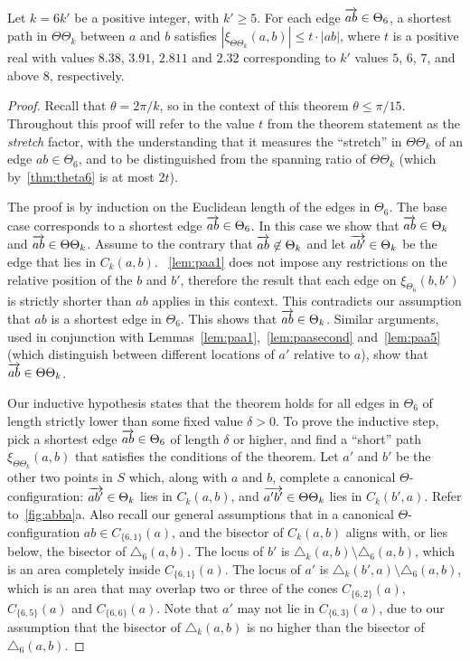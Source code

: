 \documentclass[runningheads,a4paper]{llncs}
\newcommand{\arr}[1]{\ensuremath{\protect\overrightarrow{#1}}}
\newcommand{\pp}{\xi}
\begin{document}
\begin{theorem}
Let $k = 6k'$ be a positive integer, with $k' \ge 5$. For each edge $\arr{ab} \in \Theta_6$, a shortest path in $\Theta\Theta_k$ between $a$ and $b$ satisfies $|\pp_{\Theta\Theta_k}(a, b)| \le t \cdot |ab|$, where $t$ is a positive real with values $8.38$, $3.91$, $2.811$ and $2.32$ corresponding to $k'$ values $5$, $6$, $7$, and above $8$, respectively.
\label{thm:maintheta}
\end{theorem}
\begin{proof}
Recall that $\theta = 2\pi/k$, so in the context of this theorem $\theta \le \pi/15$. Throughout this proof will refer to the value $t$ from the theorem statement as the \emph{stretch} factor, with the understanding that it measures the ``stretch'' in $\Theta\Theta_k$ of an edge $ab \in \Theta_6$, and to be distinguished from the spanning ratio of $\Theta\Theta_k$ (which by~\autoref{thm:theta6} is at most 2$t$). 

The proof is by induction on the Euclidean length of the edges in $\Theta_6$. 
The base case corresponds to a shortest edge $\arr{ab} \in \Theta_6$.
In this case we show that $\arr{ab} \in \Theta_{k}$ and $\arr{ab} \in \Theta\Theta_{k}$. Assume to the contrary that
$\arr{ab} \not\in \Theta_{k}$ and let $\arr{ab'} \in \Theta_{k}$  be the edge that lies in $C_k(a,b)$. 
~\autoref{lem:paa1} does not impose any restrictions on the relative position of the $b$ and $b'$, therefore the result that 
each edge on $\pp_{\Theta_6}(b, b')$ is strictly shorter than $ab$ applies in this context. 
This contradicts our assumption that $ab$ is a shortest edge in $\Theta_6$. This shows that $\arr{ab} \in \Theta_k$. 
Similar arguments, used in conjunction with Lemmas~\ref{lem:paa1},~\ref{lem:paasecond} and~\ref{lem:paa5} (which distinguish between different locations of $a'$ relative to $a$), show that $\arr{ab} \in \Theta\Theta_{k}$.

Our inductive hypothesis states that the theorem holds for all edges in $\Theta_6$ of length strictly lower than some fixed value $\delta > 0$. To prove the inductive step, pick a shortest edge $\arr{ab} \in \Theta_6$ of length $\delta$ or higher, and find a ``short'' path $\pp_{\Theta\Theta_k}(a, b)$ that satisfies the conditions of the theorem. Let $a'$ and $b'$ be the other two points in $S$ which, along with $a$ and $b$, complete a canonical $\Theta$-configuration: $\arr{ab'} \in \Theta_k$ lies in $C_k(a, b)$, and 
$\arr{a'b'} \in \Theta\Theta_k$ lies in $C_k(b', a)$. Refer to~\autoref{fig:abba}a. Also recall our general assumptions that in a canonical $\Theta$-configuration $ab \in C_{\{6, 1\}}(a)$, and the bisector of $C_k(a,b)$ aligns with, or lies below, the bisector of $\triangle_6(a, b)$. 
The locus of $b'$ is $\triangle_k(a,b) \setminus \triangle_6(a, b)$, which is an area completely inside $C_{\{6, 1\}}(a)$. 
The locus of $a'$ is $\triangle_k(b',a) \setminus \triangle_6(a, b)$, which is an area that may overlap two or three of the cones $C_{\{6, 2\}}(a)$, $C_{\{6, 5\}}(a)$ and $C_{\{6, 6\}}(a)$.  Note that $a'$ may not lie in $C_{\{6, 3\}}(a)$, due to our assumption that the bisector of $\triangle_k(a, b)$ is no higher than the bisector of $\triangle_6(a, b)$. 


\end{proof}
\end{document}
